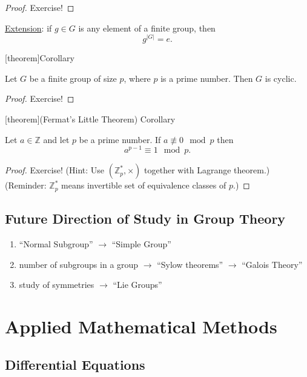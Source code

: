\documentclass[12pt]{report}
\theoremstyle{definition}
\begin{document}
\begin{proof}
    Exercise!
\end{proof}

\underline{Extension}: if $g \in G$ is any element of a finite group, then\[
    g^{|G|} = e.
\]

[theorem]{Corollary}
\begin{cyclic G}
    Let $G$ be a finite group of size $p$, where $p$ is a prime number.
    Then $G$ is cyclic.
\end{cyclic G}

\begin{proof}
    Exercise!
\end{proof}

[theorem]{(Fermat's Little Theorem) Corollary}
\begin{Fermat's Little Theorem}
    Let $a \in \mathbb{Z}$ and let $p$ be a prime number.
    If $a \not\equiv 0 \mod p$ then\[
        a^{p - 1} \equiv 1 \mod p.
    \]
\end{Fermat's Little Theorem}

\begin{proof}
    Exercise! (Hint: Use $(\mathbb{Z}_p^{*}, \times)$ together with Lagrange theorem.)
    (Reminder: $\mathbb{Z}^{*}_p$ means invertible set of equivalence classes of $p$.)
\end{proof}

\section{Future Direction of Study in Group Theory}

\begin{enumerate}
    \item ``Normal Subgroup'' $\rightarrow$ ``Simple Group''
    \item number of subgroups in a group $\rightarrow$ ``Sylow theorems''
        $\rightarrow$ ``Galois Theory''
    \item study of symmetries $\rightarrow$ ``Lie Groups''
\end{enumerate}



\chapter{Applied Mathematical Methods}

\section{Differential Equations}
\end{document}
